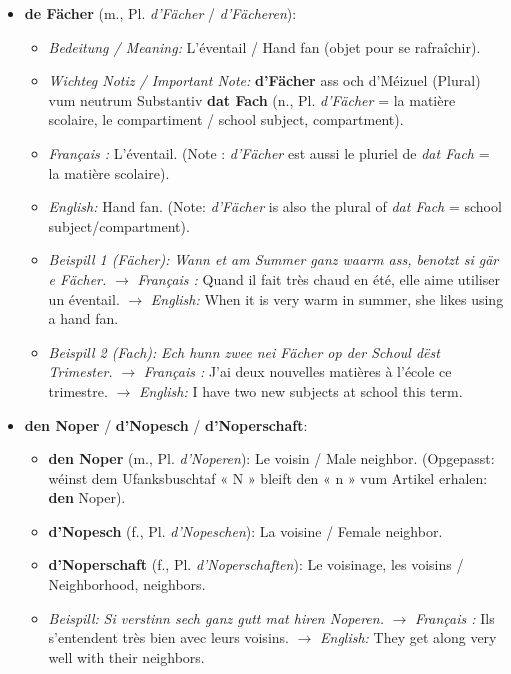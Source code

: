 \begin{itemize}
    \item \textbf{de Fächer} (m., Pl. \textit{d'Fächer} / \textit{d'Fächeren}):
    \begin{itemize}
        \item \textit{Bedeitung / Meaning:} L'éventail / Hand fan (objet pour se rafraîchir).
        \item \textit{Wichteg Notiz / Important Note:} \textbf{d'Fächer} ass och d'Méizuel (Plural) vum neutrum Substantiv \textbf{dat Fach} (n., Pl. \textit{d'Fächer} = la matière scolaire, le compartiment / school subject, compartment).
        \item \textit{Français :} L'éventail. (Note : \textit{d'Fächer} est aussi le pluriel de \textit{dat Fach} = la matière scolaire).
        \item \textit{English:} Hand fan. (Note: \textit{d'Fächer} is also the plural of \textit{dat Fach} = school subject/compartment).
        \item \textit{Beispill 1 (Fächer):} \textit{Wann et am Summer ganz waarm ass, benotzt si gär e Fächer.}
        $\rightarrow$ \textit{Français :} Quand il fait très chaud en été, elle aime utiliser un éventail.
        $\rightarrow$ \textit{English:} When it is very warm in summer, she likes using a hand fan.
        \item \textit{Beispill 2 (Fach):} \textit{Ech hunn zwee nei Fächer op der Schoul dëst Trimester.}
        $\rightarrow$ \textit{Français :} J'ai deux nouvelles matières à l'école ce trimestre.
        $\rightarrow$ \textit{English:} I have two new subjects at school this term.
    \end{itemize}

    \vspace{0.6em}

    \item \textbf{den Noper} / \textbf{d'Nopesch} / \textbf{d'Noperschaft}:
    \begin{itemize}
        \item \textbf{den Noper} (m., Pl. \textit{d'Noperen}): Le voisin / Male neighbor. (Opgepasst: wéinst dem Ufanksbuschtaf « N » bleift den « n » vum Artikel erhalen: \textbf{den} Noper).
        \item \textbf{d'Nopesch} (f., Pl. \textit{d'Nopeschen}): La voisine / Female neighbor.
        \item \textbf{d'Noperschaft} (f., Pl. \textit{d'Noperschaften}): Le voisinage, les voisins / Neighborhood, neighbors.
        \item \textit{Beispill:} \textit{Si verstinn sech ganz gutt mat hiren Noperen.}
        $\rightarrow$ \textit{Français :} Ils s'entendent très bien avec leurs voisins.
        $\rightarrow$ \textit{English:} They get along very well with their neighbors.
    \end{itemize}


\end{itemize}
